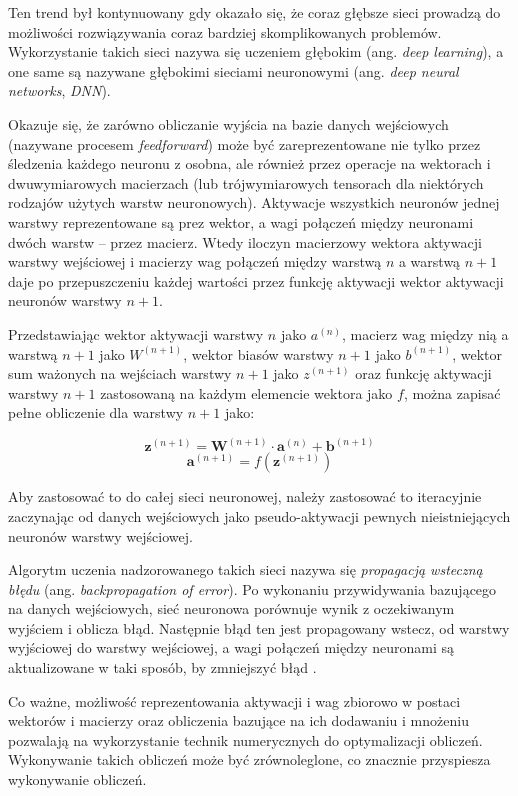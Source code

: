 Ten trend był kontynuowany gdy okazało się, że coraz głębsze sieci prowadzą do możliwości rozwiązywania coraz bardziej skomplikowanych problemów.
Wykorzystanie takich sieci nazywa się uczeniem głębokim (ang. \emph{deep learning}), a one same są nazywane głębokimi sieciami neuronowymi (ang. \emph{deep neural networks}, \emph{DNN}).

Okazuje się, że zarówno obliczanie wyjścia na bazie danych wejściowych (nazywane procesem \emph{feedforward}) może być zareprezentowane nie tylko przez śledzenia każdego neuronu z osobna, ale również przez operacje na wektorach i dwuwymiarowych macierzach (lub trójwymiarowych tensorach dla niektórych rodzajów użytych warstw neuronowych).
Aktywacje wszystkich neuronów jednej warstwy reprezentowane są prez wektor, a wagi połączeń między neuronami dwóch warstw -- przez macierz.
Wtedy iloczyn macierzowy wektora aktywacji warstwy wejściowej i macierzy wag połączeń między warstwą $n$ a warstwą $n+1$ daje po przepuszczeniu każdej wartości przez funkcję aktywacji wektor aktywacji neuronów warstwy $n+1$.

Przedstawiając wektor aktywacji warstwy $n$ jako $a^{(n)}$, macierz wag między nią a warstwą $n+1$ jako $W^{(n+1)}$, wektor biasów warstwy $n+1$ jako $b^{(n+1)}$, wektor sum ważonych na wejściach warstwy $n+1$ jako $z^{(n+1)}$ oraz funkcję aktywacji warstwy $n+1$ zastosowaną na każdym elemencie wektora jako $f$, można zapisać pełne obliczenie dla warstwy $n+1$ jako:

\[
  \mathbf{z}^{(n+1)} = \mathbf{W}^{(n+1)} \cdot \mathbf{a}^{(n)} + \mathbf{b}^{(n+1)}
\]
\[
  \mathbf{a}^{(n+1)} = f(\mathbf{z}^{(n+1)})
\]

Aby zastosować to do całej sieci neuronowej, należy zastosować to iteracyjnie zaczynając od danych wejściowych jako pseudo-aktywacji pewnych nieistniejących neuronów warstwy wejściowej.

Algorytm uczenia nadzorowanego takich sieci nazywa się \emph{propagacją wsteczną błędu} (ang. \emph{backpropagation of error}).
Po wykonaniu przywidywania bazującego na danych wejściowych, sieć neuronowa porównuje wynik z oczekiwanym wyjściem i oblicza błąd.
Następnie błąd ten jest propagowany wstecz, od warstwy wyjściowej do warstwy wejściowej, a wagi połączeń między neuronami są aktualizowane w taki sposób, by zmniejszyć błąd \cite{rojas1996backpropagation}.

Co ważne, możliwość reprezentowania aktywacji i wag zbiorowo w postaci wektorów i macierzy oraz obliczenia bazujące na ich dodawaniu i mnożeniu pozwalają na wykorzystanie technik numerycznych do optymalizacji obliczeń.
Wykonywanie takich obliczeń może być zrównoleglone, co znacznie przyspiesza wykonywanie obliczeń.

